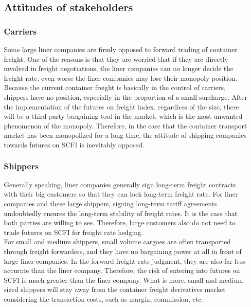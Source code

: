 \documentclass{aas}
\begin{document}
\begin{multicols}{2}
	\subsection{Attitudes of stakeholders}

	\subsubsection{Carriers}

	Some large liner companies are firmly opposed to forward trading of container freight. One of the reasons is that they are worried that if they are directly involved in freight negotiations, the liner companies can no longer decide the freight rate, even worse the liner companies may lose their monopoly position. Because the current container freight is basically in the control of carriers, shippers have no position, especially in the proportion of a small surcharge. After the implementation of the futures on freight index, regardless of the size, there will be a third-party bargaining tool in the market, which is the most unwanted phenomenon of the monopoly. Therefore, in the case that the container transport market has been monopolized for a long time, the attitude of shipping companies towards futures on SCFI is inevitably opposed. \\

	\subsubsection{Shippers}

	Generally speaking, liner companies generally sign long-term freight contracts with their big customers so that they can lock long-term freight rate. For liner companies and these large shippers, signing long-term tariff agreements undoubtedly ensures the long-term stability of freight rates. It is the case that both parties are willing to see. Therefore, large customers also do not need to trade futures on SCFI for freight rate hedging. \\

	For small and medium shippers, small volume cargoes are often transported through freight forwarders, and they have no bargaining power at all in front of large liner companies. In the forward freight rate judgment, they are also far less accurate than the liner company. Therefore, the risk of entering into futures on SCFI is much greater than the liner company. What is more, small and medium-sized shippers will stay away from the container freight derivatives market considering the transaction costs, such as margin, commission, etc. \\


\end{multicols}
\end{document}
